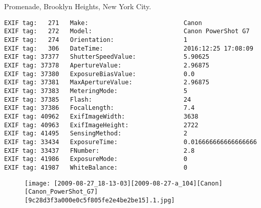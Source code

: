 \section{\protect{}}
\noindent Promenade, Brooklyn Heights, New York City.
\noindent
\begin{lstlisting}
EXIF tag:   271   Make:                          Canon
EXIF tag:   272   Model:                         Canon PowerShot G7
EXIF tag:   274   Orientation:                   1
EXIF tag:   306   DateTime:                      2016:12:25 17:08:09
EXIF tag: 37377   ShutterSpeedValue:             5.90625
EXIF tag: 37378   ApertureValue:                 2.96875
EXIF tag: 37380   ExposureBiasValue:             0.0
EXIF tag: 37381   MaxApertureValue:              2.96875
EXIF tag: 37383   MeteringMode:                  5
EXIF tag: 37385   Flash:                         24
EXIF tag: 37386   FocalLength:                   7.4
EXIF tag: 40962   ExifImageWidth:                3638
EXIF tag: 40963   ExifImageHeight:               2722
EXIF tag: 41495   SensingMethod:                 2
EXIF tag: 33434   ExposureTime:                  0.016666666666666666
EXIF tag: 33437   FNumber:                       2.8
EXIF tag: 41986   ExposureMode:                  0
EXIF tag: 41987   WhiteBalance:                  0

\end{lstlisting}
\clearpage
\begin{figure}
\raggedleft
\texttt{[image: [2009-08-27\_18-13-03][2009-08-27-a\_104][Canon][Canon\_PowerShot\_G7][9c28d3f3a000e0c5f805fe2e4be2be15].1.jpg]}
\end{figure}


\clearpage
